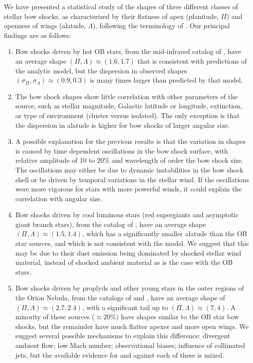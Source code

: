 \documentclass[useAMS, usenatbib, a4paper]{mnras}
\begin{document}
We have presented a statistical study of the shapes of three different
classes of stellar bow shocks, as characterized by their flatness of
apex (planitude, \(\Pi\)) and openness of wings (alatude,
\(\Lambda\)), following the terminology of
\citet[Paper~0]{Tarango-Yong:2018a}.  Our principal findings are as
follows:
\begin{enumerate}[1.]
\item Bow shocks driven by hot OB stars, from the mid-infrared catalog
  of \citet{Kobulnicky:2016a}, have an average shape
  \((\Pi, \Lambda) \approx (1.6, 1.7)\) that is consistent with predictions of the
  \citet{Wilkin:1996a} analytic model, but the dispersion in observed
  shapes \((\sigma_\Pi, \sigma_\Lambda) \approx (0.9, 0.3)\) is many times larger than
  predicted by that model.
\item The bow shock shapes show little correlation with other
  parameters of the source, such as stellar magnitude, Galactic
  latitude or longitude, extinction, or type of environment (cluster
  versus isolated).  The only exception is that the dispersion in
  alatude is higher for bow shocks of larger angular size.
\item A possible explanation for the previous results is that the
  variation in shapes is caused by time dependent oscillations in the
  bow shock surface, with relative amplitude of 10 to 20\% and
  wavelength of order the bow shock size.  The oscillations may either
  be due to dynamic instabilities in the bow shock shell or be driven
  by temporal variations in the stellar wind.  If the oscillations
  were more vigorous for stars with more powerful winds, it could
  explain the correlation with angular size.
\item Bow shocks driven by cool luminous stars (red supergiants and
  asymptotic giant branch stars), from the catalog of
  \citep{Cox:2012a}, have an average shape
  \((\Pi, \Lambda) \approx (1.5, 1.4)\), which has a significantly smaller alatude
  than the OB star sources, and which is not consistent with the
  \citet{Wilkin:1996a} model.  We suggest that this may be due to
  their dust emission being dominated by shocked stellar wind
  material, instead of shocked ambient material as is the case with
  the OB stars.
\item Bow shocks driven by proplyds and other young stars in the outer
  regions of the Orion Nebula, from the catalogs of
  \citet{Bally:2006a} and \citet{Gutierrez-Soto:2015a}, have an
  average shape of \((\Pi, \Lambda) \approx (2.7, 2.4)\), with a significant tail up
  to \((\Pi, \Lambda) \approx (7, 4)\).  A minority of these sources
  (\(\approx 20\%\)) have shapes similar to the OB star bow shocks, but the
  remainder have much flatter apexes and more open wings.  We suggest
  several possible mechanisms to explain this difference: divergent
  ambient flow; low Mach number; observational biases; influence of
  collimated jets, but the available evidence for and against each of
  these is mixed.
\end{enumerate}
\end{document}
